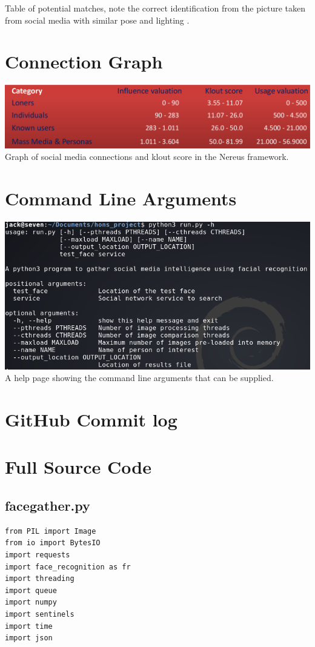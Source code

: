 \documentclass[12pt]{article}
\begin{document}
\begin{appendices}
Table of potential matches, note the correct identification from the picture taken from social media with similar pose and lighting \citep{bostonbombingcasestudy}.

\section{Connection Graph}
\label{appendix:connectiongraph}
\includegraphics[width=\linewidth]{res/connection_klout.png}
Graph of social media connections and klout score in the Nereus framework\citep{behaviourdetection}.

\section{Command Line Arguments}
\label{appendix:commandlineargs}
\includegraphics[width=\linewidth]{res/facegather_cmd_line_args.png}
A help page showing the command line arguments that can be supplied.

\section{GitHub Commit log}


\section{Full Source Code}
\subsection{facegather.py}
\begin{lstlisting}
from PIL import Image
from io import BytesIO
import requests
import face_recognition as fr
import threading
import queue
import numpy
import sentinels
import time
import json


\end{lstlisting}
\end{appendices}
\end{document}
